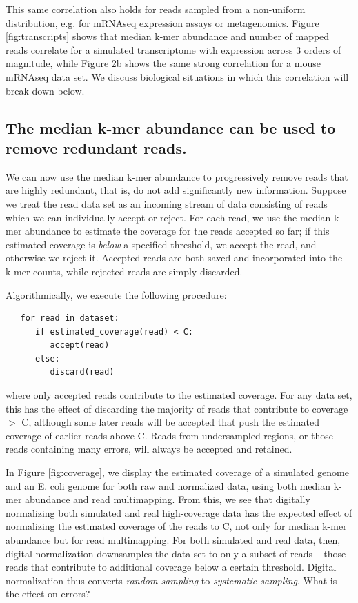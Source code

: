 \documentclass[10pt,draft]{article}
\begin{document}
This same correlation also holds for reads sampled from a non-uniform
distribution, e.g. for mRNAseq expression assays or metagenomics.
Figure \ref{fig:transcripts} shows that median k-mer abundance and number of mapped reads
correlate for a simulated transcriptome with expression across 3
orders of magnitude, while Figure 2b shows the same strong correlation
for a mouse mRNAseq data set.  We discuss biological situations in which
this correlation will break down below.

\subsection*{The median k-mer abundance can be used to remove redundant reads.}

We can now use the median k-mer abundance to progressively remove
reads that are highly redundant, that is, do not add significantly new
information.  Suppose we treat the
read data set as an incoming stream of data consisting of reads which
we can individually accept or reject.  For each read, we
use the median k-mer abundance to estimate the coverage for the reads
accepted so far; if this estimated coverage is {\em below} a specified threshold, we
accept the read, and otherwise we reject it.  Accepted reads are both
saved and incorporated into the k-mer counts, while rejected reads are
simply discarded.

Algorithmically, we execute the following procedure:

\begin{verbatim}
   for read in dataset:
      if estimated_coverage(read) < C:
         accept(read)
      else:
         discard(read)
\end{verbatim}

where only accepted reads contribute to the estimated coverage.  For any
data set, this has the effect of discarding the majority of reads that
contribute to coverage $>$ C, although some later reads will be accepted
that push the estimated coverage of earlier reads above C.  Reads from
undersampled regions, or those reads containing many errors, will always
be accepted and retained.

In Figure \ref{fig:coverage}, we display the estimated coverage of a simulated genome
and an E. coli genome for both raw and normalized data, using both
median k-mer abundance and read multimapping.  From this, we see that
digitally normalizing both simulated and real high-coverage data has
the expected effect of normalizing the estimated coverage of the reads
to C, not only for median k-mer abundance but for read multimapping.
For both simulated and real data, then, digital normalization
downsamples the data set to only a subset of reads -- those reads that
contribute to additional coverage below a certain threshold.  Digital normalization thus converts {\em
random sampling} to {\em systematic sampling}.  What is the effect on
errors?
\end{document}
